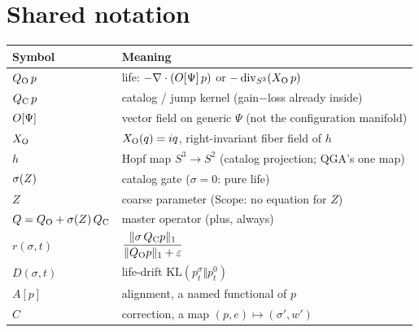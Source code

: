 \section*{Shared notation}
\begin{center}
\begin{tabular}{@{}ll@{}}
\toprule
Symbol & Meaning \\
\midrule
$Q_{\mathrm{O}}\,p$ & life: $-\nabla\cdot(O[\Psi]\,p)$ or $-\operatorname{div}_{S^{3}}(X_{\mathrm{O}}\,p)$ \\
$Q_{\mathrm{C}}\,p$ & catalog / jump kernel (gain$-$loss already inside) \\
$O[\Psi]$ & vector field on generic $\Psi$ (not the configuration manifold) \\
$X_{\mathrm{O}}$ & $X_{\mathrm{O}}(q)=iq$, right-invariant fiber field of $h$ \\
$h$ & Hopf map $S^{3}\to S^{2}$ (catalog projection; QGA's one map) \\
$\sigma(Z)$ & catalog gate ($\sigma=0$: pure life) \\
$Z$ & coarse parameter (Scope: no equation for $Z$) \\
$Q=Q_{\mathrm{O}}+\sigma(Z)\,Q_{\mathrm{C}}$ & master operator (plus, always) \\
$r(\sigma,t)$ & $\displaystyle\frac{\lVert\sigma\,Q_{\mathrm{C}} p\rVert_{1}}{\lVert Q_{\mathrm{O}} p\rVert_{1}+\varepsilon}$ \\
$D(\sigma,t)$ & life-drift $\mathrm{KL}(p_{t}^{\sigma}\Vert p_{t}^{0})$ \\
$A[p]$ & alignment, a named functional of $p$ \\
$C$ & correction, a map $(p,e)\mapsto(\sigma',w')$ \\
\bottomrule
\end{tabular}
\end{center}
